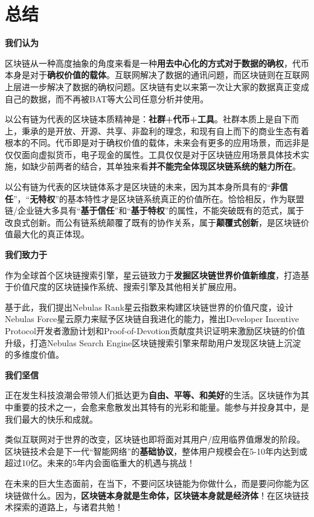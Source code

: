 \section{总结}
\label{sec:conclusion}

\textbf{我们认为}

区块链从一种高度抽象的角度来看是一种\textbf{用去中心化的方式对于数据的确权}，代币本身是对于\textbf{确权价值的载体}。互联网解决了数据的通讯问题，而区块链则在互联网上层进一步解决了数据的确权问题。区块链有史以来第一次让大家的数据真正变成自己的数据，而不再被BAT等大公司任意分析并使用。

以公有链为代表的区块链本质精神是：\textbf{社群+代币+工具}。社群本质上是自下而上，秉承的是开放、开源、共享、非盈利的理念，和现有自上而下的商业生态有着根本的不同。代币即是对于确权价值的载体，未来会有更多的应用场景，而远非是仅仅面向虚拟货币，电子现金的属性。工具仅仅是对于区块链应用场景具体技术实施，如缺少前两者的结合，其单独来看\textbf{并不能完全体现区块链系统的魅力所在}。

以公有链为代表的区块链体系才是区块链的未来，因为其本身所具有的“\textbf{非信任}”，“\textbf{无特权}”的基本特性才是区块链系统真正的价值所在。恰恰相反，作为联盟链/企业链大多具有“\textbf{基于信任}”和“\textbf{基于特权}”的属性，不能突破既有的范式，属于改良式创新。而公有链系统颠覆了既有的协作关系，属于\textbf{颠覆式创新}，是区块链价值最大化的真正体现。

\textbf{我们致力于}

作为全球首个区块链搜索引擎，星云链致力于\textbf{发掘区块链世界价值新维度}，打造基于价值尺度的区块链操作系统、搜索引擎及其他相关扩展应用。

基于此，我们提出Nebulas Rank星云指数来构建区块链世界的价值尺度，设计Nebulas Force星云原力来赋予区块链自我进化的能力，推出Developer Incentive Protocol开发者激励计划和Proof-of-Devotion贡献度共识证明来激励区块链的价值升级，打造Nebulas Search Engine区块链搜索引擎来帮助用户发现区块链上沉淀的多维度价值。

\textbf{我们坚信}

正在发生科技浪潮会带领人们抵达更为\textbf{自由、平等、和美好}的生活。区块链作为其中重要的技术之一，会愈来愈散发出其特有的光彩和能量。能参与并投身其中，是我们最大的快乐和成就。

类似互联网对于世界的改变，区块链也即将面对其用户/应用临界值爆发的阶段。区块链技术会是下一代“智能网络”的\textbf{基础协议}，整体用户规模会在5-10年内达到或超过10亿。未来的5年内会面临重大的机遇与挑战！

在未来的巨大生态面前，在当下，不要问区块链能为你做什么，而是要问你能为区块链做什么。因为，\textbf{区块链本身就是生命体，区块链本身就是经济体}！在区块链技术探索的道路上，与诸君共勉！
